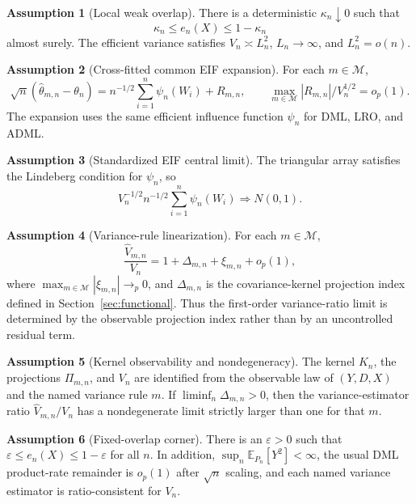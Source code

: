 \documentclass[11pt]{article}
\newcommand{\E}{\mathbb{E}}
\theoremstyle{definition}
\newtheorem{assumption}{Assumption}
\theoremstyle{plain}
\theoremstyle{remark}
\begin{document}
\begin{assumption}[Local weak overlap]\label{ass:local-overlap}
There is a deterministic \(\kappa_n\downarrow0\) such that
\[
  \kappa_n\le e_n(X)\le 1-\kappa_n
\]
almost surely.  The efficient variance satisfies \(V_n\asymp L_n^2\),
\(L_n\to\infty\), and \(L_n^2=o(n)\).
\end{assumption}

\begin{assumption}[Cross-fitted common EIF expansion]\label{ass:common-eif}
For each \(m\in\mathcal M\),
\[
  \sqrt n(\hat\theta_{m,n}-\theta_n)
  =
  n^{-1/2}\sum_{i=1}^n \psi_n(W_i)+R_{m,n},
  \qquad
  \max_{m\in\mathcal M}|R_{m,n}|/V_n^{1/2}=o_p(1).
\]
The expansion uses the same efficient influence function \(\psi_n\) for DML,
LRO, and ADML.
\end{assumption}

\begin{assumption}[Standardized EIF central limit]\label{ass:eif-clt}
The triangular array satisfies the Lindeberg condition for \(\psi_n\), so
\[
  V_n^{-1/2}n^{-1/2}\sum_{i=1}^n\psi_n(W_i)\Rightarrow N(0,1).
\]
\end{assumption}

\begin{assumption}[Variance-rule linearization]\label{ass:variance-linear}
For each \(m\in\mathcal M\),
\[
  \frac{\hat V_{m,n}}{V_n}
  =
  1+\Delta_{m,n}+\xi_{m,n}+o_p(1),
\]
where \(\max_{m\in\mathcal M}|\xi_{m,n}|\to_p0\), and \(\Delta_{m,n}\) is the covariance-kernel projection index defined in Section~\ref{sec:functional}.  Thus the first-order variance-ratio limit is determined by the observable projection index rather than by an uncontrolled residual term.
\end{assumption}

\begin{assumption}[Kernel observability and nondegeneracy]\label{ass:kernel-observable}
The kernel \(K_n\), the projections \(\Pi_{m,n}\), and \(V_n\) are identified from the observable law of \((Y,D,X)\) and the named variance rule \(m\).  If \(\liminf_n\Delta_{m,n}>0\), then the variance-estimator ratio \(\hat V_{m,n}/V_n\) has a nondegenerate limit strictly larger than one for that \(m\).
\end{assumption}

\begin{assumption}[Fixed-overlap corner]\label{ass:fixed-overlap}
There is an \(\varepsilon>0\) such that
\(\varepsilon\le e_n(X)\le1-\varepsilon\) for all \(n\).  In addition,
\(\sup_n\E_{P_n}[Y^2]<\infty\), the usual DML product-rate remainder is
\(o_p(1)\) after \(\sqrt n\) scaling, and each named variance estimator is
ratio-consistent for \(V_n\).
\end{assumption}
\end{document}
